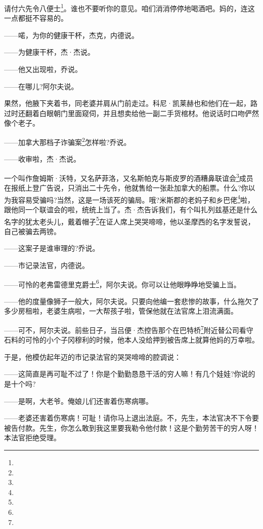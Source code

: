 \par 请付六先令八便士\footnote{}。谁也不要听你的意见。咱们消消停停地喝酒吧。妈的，连这一点都挺不容易的。
\par ——喏，为你的健康干杯，杰克，内德说。
\par ——为健康干杯，杰·杰说。
\par ——他又出现啦，乔说。
\par ——在哪儿?阿尔夫说。
\par 果然，他腋下夹着书，同老婆并肩从门前走过。科尼·凯莱赫也和他们在一起，路过时还翻着白眼朝门里面窥伺，并且想卖给他一副二手货棺材。他说话时口吻俨然像个老子。
\par ——加拿大那档子诈骗案\footnote{}怎样啦?乔说。
\par ——收审啦，杰·杰说。
\par 一个叫作詹姆斯·沃特，又名萨菲洛，又名斯帕克与斯皮罗的酒糟鼻联谊会\footnote{}成员在报纸上登广告说，只消出二十先令，他就售给一张赴加拿大的船票。什么?你以为我容易受骗吗?当然，这是一场该死的骗局。哦?米斯郡的老妈子和乡巴佬\footnote{}啦，跟他同一个联谊会的啦，统统上当了。杰·杰告诉我们，有个叫扎列兹基还是什么名字的犹太老头儿，戴着帽子\footnote{}在证人席上哭哭啼啼，他以圣摩西的名字发誓说，自己被骗去两镑。
\par ——这案子是谁审理的?乔说。
\par ——市记录法官，内德说。
\par ——可怜的老弗雷德里克爵士\footnote{}，阿尔夫说。你可以让他眼睁睁地受骗上当。
\par ——他的度量像狮子一般大，阿尔夫说。只要向他编一套悲惨的故事，什么拖欠了多少房租啦，老婆生病啦，一大帮孩子啦，管保他就在法官席上泪流满面。
\par ——可不，阿尔夫说。前些日子，当吕便·杰控告那个在巴特桥\footnote{}附近替公司看守石料的可怜的小个子冈穆利的时候，他本人没给押到被告席上就算他妈的万幸啦。
\par 于是，他模仿起年迈的市记录法官的哭哭啼啼的腔调说：
\par ——这简直是再可耻不过了！你是个勤勤恳恳干活的穷人嘛！有几个娃娃?你说的是十个吗?
\par ——是啊，大老爷。俺娘儿们还害着伤寒病哪。
\par ——老婆还害着伤寒病！可耻！请你马上退出法庭。不，先生，本法官决不下令要被告付款。先生，你怎么敢到我这里要我勒令他付款！这是个勤劳苦干的穷人呀！本法官拒绝受理。
